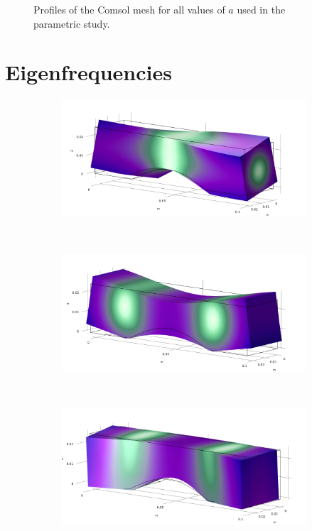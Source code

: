 \documentclass[a4paper]{article}
\begin{document}
\begin{figure}[h]
\begin{subfigure}{0.22\linewidth}
	\end{subfigure}
	\caption{Profiles of the Comsol mesh for all values of $a$ used in the parametric study.}
	\label{fig:mesh}
\end{figure}

\section{Eigenfrequencies}
\begin{figure}[h]
	\centering
	\begin{subfigure}{0.3\linewidth}
		\centering
		\includegraphics[width=0.95\linewidth]{01a.png}
	\end{subfigure}
	~
	\begin{subfigure}{0.3\linewidth}
		\centering
		\includegraphics[width=0.95\linewidth]{02a.png}
	\end{subfigure}
	~
	\begin{subfigure}{0.3\linewidth}
		\centering
		\includegraphics[width=0.95\linewidth]{03a.png}
	\end{subfigure}
	

\end{figure}
\end{document}
